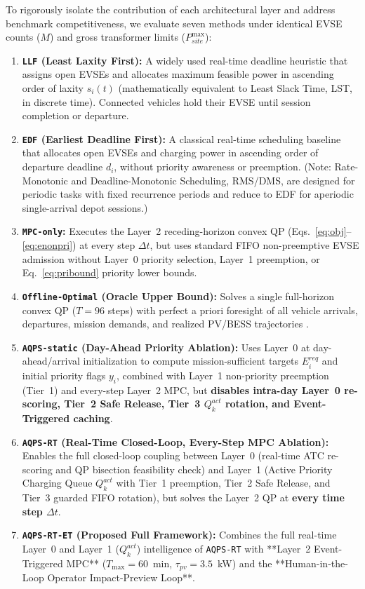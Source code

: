\documentclass[final,3p,times,twocolumn]{elsarticle}
\begin{document}
To rigorously isolate the contribution of each architectural layer and address benchmark competitiveness, we evaluate seven methods under identical EVSE counts ($M$) and gross transformer limits ($P_{site}^{\max}$):
\begin{enumerate}
    \item \textbf{\texttt{LLF} (Least Laxity First):} A widely used real-time deadline heuristic \cite{lee2019acnsim,lee2021adaptive} that assigns open EVSEs and allocates maximum feasible power in ascending order of laxity $s_i(t)$ (mathematically equivalent to Least Slack Time, LST, in discrete time). Connected vehicles hold their EVSE until session completion or departure.
    \item \textbf{\texttt{EDF} (Earliest Deadline First):} A classical real-time scheduling baseline that allocates open EVSEs and charging power in ascending order of departure deadline $d_i$, without priority awareness or preemption. (Note: Rate-Monotonic and Deadline-Monotonic Scheduling, RMS/DMS, are designed for periodic tasks with fixed recurrence periods and reduce to EDF for aperiodic single-arrival depot sessions.)
    \item \textbf{\texttt{MPC-only}:} Executes the Layer~2 receding-horizon convex QP (Eqs.~\eqref{eq:obj}--\eqref{eq:enonpri}) at every step $\Delta t$, but uses standard FIFO non-preemptive EVSE admission without Layer~0 priority selection, Layer~1 preemption, or Eq.~\eqref{eq:pribound} priority lower bounds.
    \item \textbf{\texttt{Offline-Optimal} (Oracle Upper Bound):} Solves a single full-horizon convex QP ($T = 96$ steps) with perfect a priori foresight of all vehicle arrivals, departures, mission demands, and realized PV/BESS trajectories \cite{orfanoudakis2025ev2gym,vales2026emergent}.
    \item \textbf{\texttt{AQPS-static} (Day-Ahead Priority Ablation):} Uses Layer~0 at day-ahead/arrival initialization to compute mission-sufficient targets $E_i^{req}$ and initial priority flags $y_i$, combined with Layer~1 non-priority preemption (Tier~1) and every-step Layer~2 MPC, but \textbf{disables intra-day Layer~0 re-scoring, Tier~2 Safe Release, Tier~3 $Q_k^{act}$ rotation, and Event-Triggered caching}.
    \item \textbf{\texttt{AQPS-RT} (Real-Time Closed-Loop, Every-Step MPC Ablation):} Enables the full closed-loop coupling between Layer~0 (real-time ATC re-scoring and QP bisection feasibility check) and Layer~1 (Active Priority Charging Queue $Q_k^{act}$ with Tier~1 preemption, Tier~2 Safe Release, and Tier~3 guarded FIFO rotation), but solves the Layer~2 QP at \textbf{every time step $\Delta t$}.
    \item \textbf{\texttt{AQPS-RT-ET} (Proposed Full Framework):} Combines the full real-time Layer~0 and Layer~1 ($Q_k^{act}$) intelligence of \texttt{AQPS-RT} with **Layer~2 Event-Triggered MPC** ($T_{\max} = 60$~min, $\tau_{pv} = 3.5$~kW) and the **Human-in-the-Loop Operator Impact-Preview Loop**.
\end{enumerate}
\end{document}
